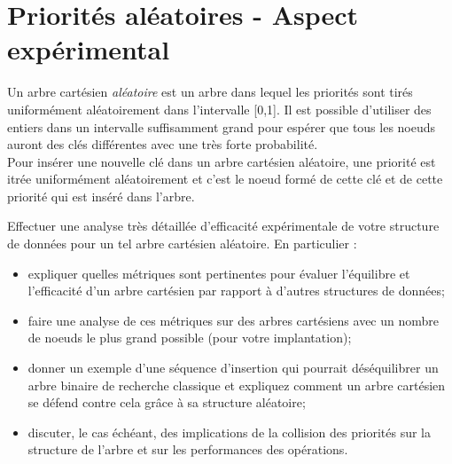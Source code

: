 \documentclass[a4paper,12pt]{report}
\begin{document}

\newpage

\renewcommand{\chaptername}{Exercice}
\chapter{Priorités aléatoires - Aspect expérimental}

Un arbre cartésien \textit{aléatoire} est un arbre dans lequel les priorités sont tirés uniformément aléatoirement dans l'intervalle [0,1]. Il est possible
    d'utiliser des entiers dans un intervalle suffisamment grand pour espérer que tous les noeuds auront des clés différentes avec une très forte probabilité.\\

Pour insérer une nouvelle clé dans un arbre cartésien aléatoire, une priorité est itrée uniformément aléatoirement et c'est le noeud formé de cette clé et de
    cette priorité qui est inséré dans l'arbre.




Effectuer une analyse très détaillée d'efficacité expérimentale de votre structure de données pour un tel arbre cartésien aléatoire. En particulier :\\[-0.4cm]
\begin{itemize}
    \item expliquer quelles métriques sont pertinentes pour évaluer l'équilibre et l'efficacité d'un arbre cartésien par rapport à d'autres structures de données;
    \item faire une analyse de ces métriques sur des arbres cartésiens avec un nombre de noeuds le plus grand possible (pour votre implantation);
    \item donner un exemple d'une séquence d'insertion qui pourrait déséquilibrer un arbre binaire de recherche classique et expliquez comment un arbre cartésien se défend
        contre cela grâce à sa structure aléatoire;
    \item discuter, le cas échéant, des implications de la collision des priorités sur la structure de l'arbre et sur les performances des opérations.
\end{itemize}
\end{document}
